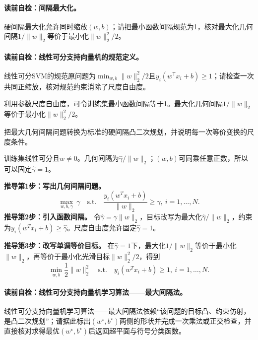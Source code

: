 \paragraph{读前自检：间隔最大化。}硬间隔最大化允许同时缩放$(w,b)$；请把最小函数间隔规范为1，核对最大化几何间隔$1/\lVert w\rVert_2$等价于最小化$\lVert w\rVert_2^2/2$。\par
\paragraph{读前自检：线性可分支持向量机的规范定义。}线性可分SVM的规范原问题为$\min_{w,b}\lVert w\rVert_2^2/2$且$y_i(w^{\mathsf T}x_i+b)\ge1$；请检查一次共同正缩放，核对规范约束消除了尺度自由度。\par

利用参数尺度自由度，可令训练集最小函数间隔等于1。最大化几何间隔$1/\lVert w\rVert_2$等价于最小化$\lVert w\rVert_2^2/2$。

\label{struct:V3-C02-CH11}
\begin{derivationgoalbox}
把最大几何间隔问题转换为标准的硬间隔凸二次规划，并说明每一次等价变换的尺度条件。
\end{derivationgoalbox}
\begin{derivationprepbox}
训练集线性可分且$w\neq0$。几何间隔为$\widehat\gamma/\lVert w\rVert_2$；$(w,b)$可同乘任意正数，所以可以固定$\widehat\gamma=1$。
\end{derivationprepbox}

\textbf{推导第1步：写出几何间隔问题。}
\[
\max_{w,b,\gamma}\ \gamma
\quad\text{s.t.}\quad
\frac{y_i(w^Tx_i+b)}{\lVert w\rVert_2}\geq\gamma,\ i=1,\ldots,N.
\]
\textbf{推导第2步：引入函数间隔。}
令$\widehat\gamma=\gamma\lVert w\rVert_2$，目标改写为最大化$\widehat\gamma/\lVert w\rVert_2$，约束为$y_i(w^Tx_i+b)\geq\widehat\gamma$。尺度自由度允许固定$\widehat\gamma=1$。

\textbf{推导第3步：改写单调等价目标。}
在$\widehat\gamma=1$下，最大化$1/\lVert w\rVert_2$等价于最小化$\lVert w\rVert_2$，再等价于最小化光滑目标$\lVert w\rVert_2^2/2$，得到
\[
\min_{w,b}\frac12\lVert w\rVert_2^2
\quad\text{s.t.}\quad y_i(w^Tx_i+b)\geq1,\ i=1,\ldots,N.
\]

\paragraph{读前自检：线性可分支持向量机学习算法——最大间隔法。}线性可分支持向量机学习算法——最大间隔法依赖“该问题的目标凸、约束仿射，是凸二次规划”；请据此标出$(w^\star,b^\star)$两侧的形状并完成一次乘法或正交检查，并直接核对求得最优$(w^\star,b^\star)$后返回超平面与符号分类函数。\par

